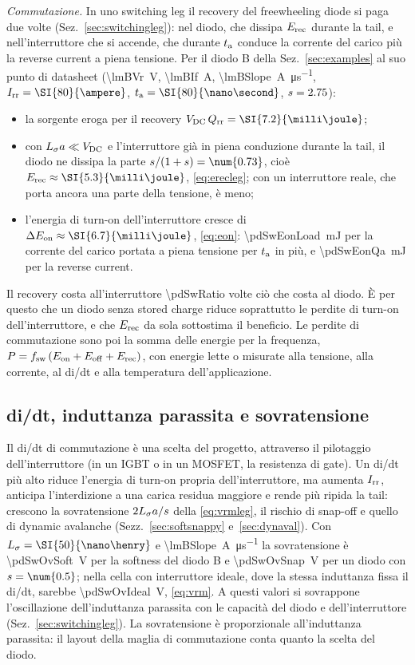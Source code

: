 \documentclass[10pt,a4paper]{scrartcl}
\let\newcommand\pdvaluedefine
\newcommand{\Irr}{I_\mathrm{rr}}
\newcommand{\Qrr}{Q_\mathrm{rr}}
\newcommand{\ta}{t_\mathrm{a}}
\newcommand{\Ls}{L_\sigma}                    %
\newcommand{\Vdc}{V_\mathrm{DC}}
\newcommand{\Erec}{E_\mathrm{rec}}
\begin{document}
\emph{Commutazione.} In uno switching leg il recovery del freewheeling diode si paga due volte (Sez.~\ref{sec:switchingleg}): nel diodo, che dissipa $\Erec$ durante la tail, e nell'interruttore che si accende, che durante $\ta$ conduce la corrente del carico più la reverse current a piena tensione. Per il diodo B della Sez.~\ref{sec:examples} al suo punto di datasheet (\SI{\lmBVr}{\volt}, \SI{\lmBIf}{\ampere}, \SI{\lmBSlope}{\ampere\per\micro\second}, $\Irr = \SI{\lmBIrr}{\ampere}$, $\ta = \SI{\lmBTa}{\nano\second}$, $s = 2.75$):
\begin{itemize}
\item la sorgente eroga per il recovery $\Vdc\,\Qrr = \SI{\pdSwErecIdeal}{\milli\joule}$;
\item con $\Ls a \ll \Vdc$ e l'interruttore già in piena conduzione durante la tail, il diodo ne dissipa la parte $s/(1+s) = \num{\pdSwK}$, cioè $\Erec \approx \SI{\pdSwErecDiode}{\milli\joule}$, \eqref{eq:erecleg}; con un interruttore reale, che porta ancora una parte della tensione, è meno;
\item l'energia di turn-on dell'interruttore cresce di $\Delta E_\mathrm{on} \approx \SI{\pdSwEonExtra}{\milli\joule}$, \eqref{eq:eon}: \SI{\pdSwEonLoad}{\milli\joule} per la corrente del carico portata a piena tensione per $\ta$ in più, e \SI{\pdSwEonQa}{\milli\joule} per la reverse current.
\end{itemize}
Il recovery costa all'interruttore \num{\pdSwRatio} volte ciò che costa al diodo. È per questo che un diodo senza stored charge riduce soprattutto le perdite di turn-on dell'interruttore, e che $\Erec$ da sola sottostima il beneficio. Le perdite di commutazione sono poi la somma delle energie per la frequenza, $P = f_\mathrm{sw}\,(E_\mathrm{on} + E_\mathrm{off} + \Erec)$, con energie lette o misurate alla tensione, alla corrente, al di/dt e alla temperatura dell'applicazione.

\subsection{di/dt, induttanza parassita e sovratensione}
Il di/dt di commutazione è una scelta del progetto, attraverso il pilotaggio dell'interruttore (in un IGBT o in un MOSFET, la resistenza di gate). Un di/dt più alto riduce l'energia di turn-on propria dell'interruttore, ma aumenta $\Irr$, anticipa l'interdizione a una carica residua maggiore e rende più ripida la tail: crescono la sovratensione $2\Ls a/s$ della \eqref{eq:vrmleg}, il rischio di snap-off e quello di dynamic avalanche (Sezz.~\ref{sec:softsnappy} e~\ref{sec:dynaval}). Con $\Ls = \SI{\pdSwLs}{\nano\henry}$ e \SI{\lmBSlope}{\ampere\per\micro\second} la sovratensione è \SI{\pdSwOvSoft}{\volt} per la softness del diodo B e \SI{\pdSwOvSnap}{\volt} per un diodo con $s = \num{\pdSwSnapS}$; nella cella con interruttore ideale, dove la stessa induttanza fissa il di/dt, sarebbe \SI{\pdSwOvIdeal}{\volt}, \eqref{eq:vrm}. A questi valori si sovrappone l'oscillazione dell'induttanza parassita con le capacità del diodo e dell'interruttore (Sez.~\ref{sec:switchingleg}). La sovratensione è proporzionale all'induttanza parassita: il layout della maglia di commutazione conta quanto la scelta del diodo.
\end{document}
